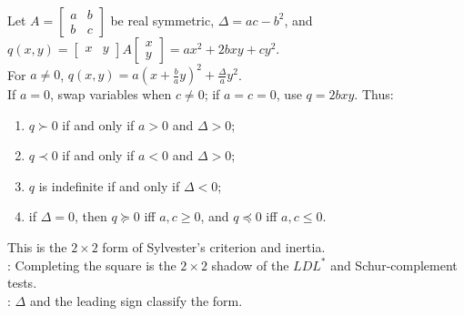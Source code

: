 \begin{method} \label{meth:two-by-two-quadratic-form-test} \\
Let $A=\begin{bmatrix}a&b\\ b&c\end{bmatrix}$ be real symmetric, $\Delta=ac-b^2$, and $q(x,y)=\begin{bmatrix}x&y\end{bmatrix}A\begin{bmatrix}x\\y\end{bmatrix}=ax^2+2bxy+cy^2$.\\
For $a\neq0$, $q(x,y)=a\left(x+\frac{b}{a}y\right)^2+\frac{\Delta}{a}y^2$.\\
If $a=0$, swap variables when $c\neq0$; if $a=c=0$, use $q=2bxy$. Thus:
\begin{enumerate}[label=(\roman*)]
\setlength{\itemsep}{0pt}
\item $q\succ0$ if and only if $a>0$ and $\Delta>0$;
\item $q\prec0$ if and only if $a<0$ and $\Delta>0$;
\item $q$ is indefinite if and only if $\Delta<0$;
\item if $\Delta=0$, then $q\succeq0$ iff $a,c\geq0$, and $q\preceq0$ iff $a,c\leq0$.
\end{enumerate}
This is the $2\times2$ form of Sylvester's criterion and inertia.\\
: Completing the square is the $2\times2$ shadow of the $LDL^*$ and Schur-complement tests.\\
: $\Delta$ and the leading sign classify the form.
\end{method}

